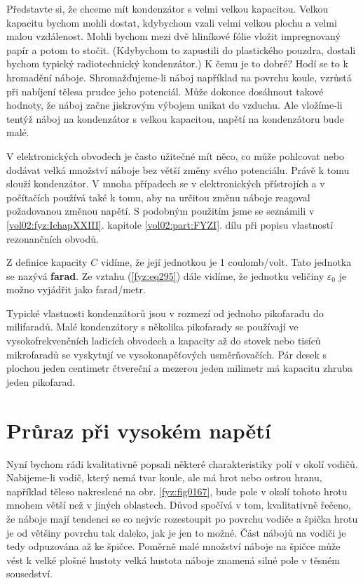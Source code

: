   Představte si, že chceme mít kondenzátor s velmi velkou kapacitou. Velkou kapacitu bychom mohli
  dostat, kdybychom vzali velmi velkou plochu a velmi malou vzdálenost. Mohli bychom mezi dvě
  hliníkové fólie vložit impregnovaný papír a potom to stočit. (Kdybychom to zapustili do
  plastického pouzdra, dostali bychom typický radiotechnický kondenzátor.) K čemu je to dobré? Hodí
  se to k hromadění náboje. Shromažďujeme-li náboj například na povrchu koule, vzrůstá při nabíjení
  tělesa prudce jeho potenciál. Může dokonce dosáhnout takové hodnoty, že náboj začne jiskrovým
  výbojem unikat do vzduchu. Ale vložíme-li tentýž náboj na kondenzátor s velkou kapacitou, napětí
  na kondenzátoru bude malé.

  V elektronických obvodech je často užitečné mít něco, co může pohlcovat nebo dodávat velká
  množství náboje bez větší změny svého potenciálu. Právě k tomu slouží kondenzátor. V mnoha
  případech se v elektronických přístrojích a v počítačích používá také k tomu, aby na určitou změnu
  náboje reagoval požadovanou změnou napětí. S podobným použitím jsme se seznámili v
  \ref{vol02:fyz:IchapXXIII}. kapitole \ref{vol02:part:FYZI}. dílu při popisu vlastností rezonančních obvodů.

  Z definice kapacity \(C\) vidíme, že její jednotkou je 1 coulomb/volt. Tato jednotka se nazývá
  \textbf{farad}. Ze vztahu (\ref{fyz:eq295}) dále vidíme, že jednotku veličiny \(\varepsilon_0\) je
  možno vyjádřit jako farad/metr.

  Typické vlastnosti kondenzátorů jsou v rozmezí od jednoho pikofaradu do milifaradů. Malé
  kondenzátory s několika pikofarady se používají ve vysokofrekvenčních ladicích obvodech a kapacity
  až do stovek nebo tisíců mikrofaradů se vyskytují ve vysokonapěťových usměrňovačích. Pár desek s
  plochou jeden centimetr čtvereční a mezerou jeden milimetr má kapacitu zhruba jeden pikofarad.
  
\section{Průraz při vysokém napětí}\label{fyz:IIchapVsecXX}
  Nyní bychom rádi kvalitativně popsali některé charakteristiky polí v okolí vodičů. Nabijeme-li
  vodič, který nemá tvar koule, ale má hrot nebo ostrou hranu, například těleso nakreslené na obr.
  \ref{fyz:fig0167}, bude pole v okolí tohoto hrotu mnohem větší než v jiných oblastech. Důvod
  spočívá v tom, kvalitativně řečeno, že náboje mají tendenci se co nejvíc rozestoupit po povrchu
  vodiče a špička hrotu je od většiny povrchu tak daleko, jak je jen to možné. Část nábojů na vodiči
  je tedy odpuzována až ke špičce. Poměrně malé množství náboje na špičce může vést k velké plošné
  hustoty velká hustota náboje znamená silné pole v těsném sousedství.

